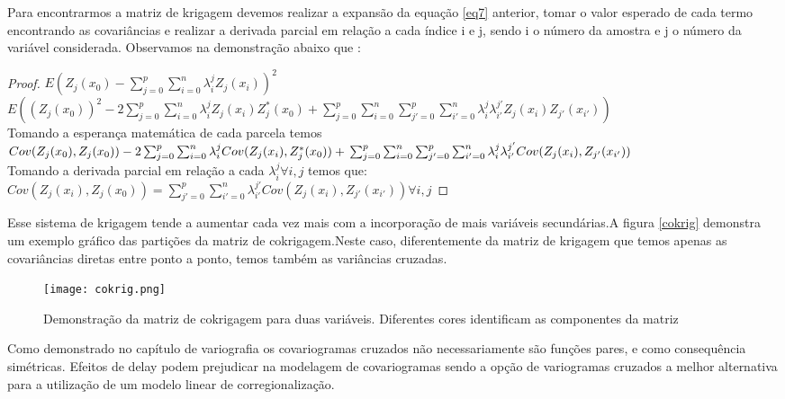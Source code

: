 Para encontrarmos a matriz de krigagem devemos realizar a expansão da equação \eqref{eq7} anterior, tomar o valor esperado de cada termo encontrando as covariâncias e realizar a derivada parcial em relação a cada índice i e j, sendo i o número da amostra e j o número da variável considerada. Observamos na demonstração abaixo que :

 
\begin{proof}
	 $E\left( Z_{j} (x_{0}) - \sum_{j=0}^{p}\sum_{i=0}^{n} \lambda^j_{i} Z_j(x_{i})\right)^2$
	 \\
	 $E\left( (Z_{j} (x_{0}))^2 -2\sum_{j=0}^{p}\sum_{i=0}^{n} \lambda^j_{i} Z_j(x_{i})Z^*_{j} (x_{0}) + \sum_{j=0}^{p}\sum_{i=0}^{n} \sum_{j'=0}^{p}\sum_{i'=0}^{n}\lambda^j_{i}\lambda^{j'}_{i'} Z_j(x_{i})Z_{j'}(x_{i'})  \right)$
	 \\
	 Tomando a esperança matemática de cada parcela temos
	 \\
	 $Cov(Z_{j} (x_{0}),Z_{j} (x_{0}) ) -2\sum_{j=0}^{p}\sum_{i=0}^{n} \lambda^j_{i} Cov(Z_j(x_{i}),Z^*_{j} (x_{0})) + \\ \sum_{j=0}^{p}\sum_{i=0}^{n} \sum_{j'=0}^{p}\sum_{i'=0}^{n}\lambda^j_{i}\lambda^{j'}_{i'} Cov(Z_j(x_{i}),Z_{j'}(x_{i'}))$\\
	 Tomando a derivada parcial em relação a cada $\lambda^j_{i} \forall i,j$ temos que:
	 \\
	 $Cov(Z_{j}(x_{i}),Z_{j} (x_{0}))=\sum_{j'=0}^{p}\sum_{i'=0}^{n}\lambda^{j'}_{i'}Cov(Z_j(x_{i}),Z_{j'}(x_{i'})) \forall i,j$
\end{proof}

Esse sistema de krigagem tende a aumentar cada vez mais com a incorporação de mais variáveis secundárias.A figura \eqref{cokrig} demonstra um exemplo gráfico das partições da matriz de cokrigagem.Neste caso, diferentemente da matriz de krigagem que temos apenas as covariâncias diretas entre ponto a ponto, temos também as variâncias cruzadas.

\begin{figure}[H]
	\centering
	\texttt{[image: cokrig.png]}	
	\caption{Demonstração da matriz de cokrigagem para duas variáveis. Diferentes cores identificam as componentes da matriz}
	\label{cokrig}
\end{figure} 

Como demonstrado no capítulo de variografia os covariogramas cruzados não necessariamente são funções pares, e como consequência simétricas. Efeitos de delay podem prejudicar na modelagem de covariogramas sendo a opção de variogramas cruzados a melhor alternativa para a utilização de um modelo linear de corregionalização. 

